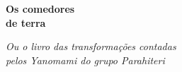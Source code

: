 

\begingroup\thispagestyle{empty}\vspace*{.05\textheight} 

              \formular
              \huge
              \noindent
              \textbf{Os comedores\\de terra}
              
              \vspace{0.3em}

              \noindent\normalsize\textit{Ou o livro das transformações contadas\\pelos Yanomami do  grupo Parahiteri}
                    
\endgroup
\vfill
\pagebreak